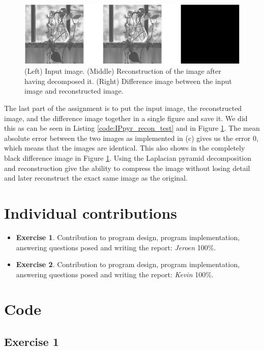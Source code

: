 \documentclass{article}
\begin{document}
\begin{figure}[h]
    \centering
    \includegraphics[width=\textwidth]{Assignment_3/output_plots/IPpyr_recon_test.png}
    \caption{(Left) Input image. (Middle) Reconstruction of the image after having decomposed it. (Right) Difference image between the input image and reconstructed image.}
    \label{fig:recon_all}
\end{figure}
The last part of the assignment is to put the input image, the reconstructed image, and the difference image together in a single figure and save it. We did this as can be seen in  Listing \ref{code:IPpyr_recon_test} and in Figure \ref{fig:recon_all}. The mean absolute error between the two images as implemented in (c) gives us the error $0$, which means that the images are identical. This also shows in the completely black difference image in Figure \ref{fig:recon_all}. Using the Laplacian pyramid decomposition and reconstruction give the ability to compress the image without losing detail and later reconstruct the exact same image as the original.

\section*{Individual contributions}
\begin{itemize}
    \item \textbf{Exercise 1}. Contribution to program design, program implementation, answering questions posed and writing the report: \textit{Jeroen} 100\%.
    \item \textbf{Exercise 2}. Contribution to program design, program implementation, answering questions posed and writing the report: \textit{Kevin} 100\%.
\end{itemize}


\typeout{}


\newpage
\appendix
\section{Code}
\subsection{Exercise 1}
\end{document}
